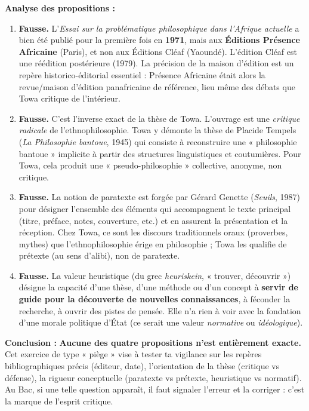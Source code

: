 \documentclass[11pt]{article}
\newcommand{\cle}[1]{{\popxbold\color{popdark}#1}}
\begin{document}
\begin{corrige}
\textbf{Analyse des propositions :}

\begin{enumerate}
\item \textbf{Fausse.} L'\emph{Essai sur la problématique philosophique dans l'Afrique actuelle} a bien été publié pour la première fois en \textbf{1971}, mais aux \textbf{Éditions Présence Africaine} (Paris), et non aux Éditions Cléaf (Yaoundé). L'édition Cléaf est une réédition postérieure (1979). La précision de la maison d'édition est un repère historico-éditorial essentiel : Présence Africaine était alors la revue/maison d'édition panafricaine de référence, lieu même des débats que Towa critique de l'intérieur.
\item \textbf{Fausse.} C'est l'inverse exact de la thèse de Towa. L'ouvrage est une \emph{critique radicale} de l'ethnophilosophie. Towa y démonte la thèse de Placide Tempels (\emph{La Philosophie bantoue}, 1945) qui consiste à reconstruire une « philosophie bantoue » implicite à partir des structures linguistiques et coutumières. Pour Towa, cela produit une « pseudo-philosophie » collective, anonyme, non critique.
\item \textbf{Fausse.} La notion de \cle{paratexte} est forgée par Gérard Genette (\emph{Seuils}, 1987) pour désigner l'ensemble des éléments qui accompagnent le texte principal (titre, préface, notes, couverture, etc.) et en assurent la présentation et la réception. Chez Towa, ce sont les discours traditionnels oraux (proverbes, mythes) que l'ethnophilosophie érige en philosophie ; Towa les qualifie de \cle{prétexte} (au sens d'alibi), non de paratexte.
\item \textbf{Fausse.} La \cle{valeur heuristique} (du grec \emph{heuriskein}, « trouver, découvrir ») désigne la capacité d'une thèse, d'une méthode ou d'un concept à \textbf{servir de guide pour la découverte de nouvelles connaissances}, à féconder la recherche, à ouvrir des pistes de pensée. Elle n'a rien à voir avec la fondation d'une morale politique d'État (ce serait une valeur \emph{normative} ou \emph{idéologique}).
\end{enumerate}

\textbf{Conclusion :} \textbf{Aucune des quatre propositions n'est entièrement exacte.} Cet exercice de type « piège » vise à tester ta vigilance sur les repères bibliographiques précis (éditeur, date), l'orientation de la thèse (critique vs défense), la rigueur conceptuelle (paratexte vs prétexte, heuristique vs normatif). Au Bac, si une telle question apparaît, il faut signaler l'erreur et la corriger : c'est la marque de l'esprit critique.
\end{corrige}
\end{document}

